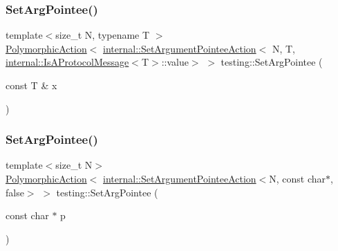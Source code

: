 \mbox{\label{namespacetesting_a5740a5033b88c37666fcd09a269d123f}} 
\subsubsection{\texorpdfstring{Set\+Arg\+Pointee()}{SetArgPointee()}\hspace{0.1cm}{\footnotesize\ttfamily [1/3]}}
{\footnotesize\ttfamily template$<$size\+\_\+t N, typename T $>$ \\
\hyperlink{classtesting_1_1_polymorphic_action}{Polymorphic\+Action}$<$ \hyperlink{classtesting_1_1internal_1_1_set_argument_pointee_action}{internal\+::\+Set\+Argument\+Pointee\+Action}$<$ N, T, \hyperlink{structtesting_1_1internal_1_1_is_a_protocol_message}{internal\+::\+Is\+A\+Protocol\+Message}$<$T$>$\+::value$>$ $>$ testing\+::\+Set\+Arg\+Pointee (\begin{DoxyParamCaption}\item[{const T \&}]{x }\end{DoxyParamCaption})}

\mbox{\label{namespacetesting_a4a190fd2d02fb7cd79c5b3df3f80b647}} 
\subsubsection{\texorpdfstring{Set\+Arg\+Pointee()}{SetArgPointee()}\hspace{0.1cm}{\footnotesize\ttfamily [2/3]}}
{\footnotesize\ttfamily template$<$size\+\_\+t N$>$ \\
\hyperlink{classtesting_1_1_polymorphic_action}{Polymorphic\+Action}$<$ \hyperlink{classtesting_1_1internal_1_1_set_argument_pointee_action}{internal\+::\+Set\+Argument\+Pointee\+Action}$<$N, const char$\ast$, false$>$ $>$ testing\+::\+Set\+Arg\+Pointee (\begin{DoxyParamCaption}\item[{const char $\ast$}]{p }\end{DoxyParamCaption})}

\mbox{\label{namespacetesting_ac128085b4a8d64563fd5ccef324ea177}} 
